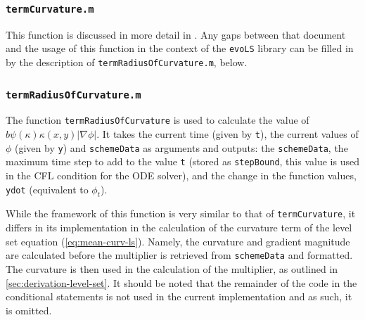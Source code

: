 \documentclass{article}
\begin{document}
\subsubsection{\texttt{termCurvature.m}}
\label{sec:termCurv}

This function is discussed in more detail in \cite{mitchell}. Any
gaps between that document and the usage of this function in the
context of the \texttt{evoLS} library can be filled in by the
description of \texttt{termRadiusOfCurvature.m}, below.

\subsubsection{\texttt{termRadiusOfCurvature.m}}
\label{sec:termRoC}



The function \texttt{termRadiusOfCurvature} is used to calculate
the value of $b\psi(\kappa)\kappa(x,y)\left|\nabla
  \phi\right|$. It takes the current time (given by \texttt{t}), the current values of
$\phi$ (given by \texttt{y}) and \texttt{schemeData} as arguments and
outputs: the \texttt{schemeData}, the maximum time step to add to
the value \texttt{t} (stored as \texttt{stepBound}, this value is
used in the CFL condition for the ODE solver), and the change in the
function values, \texttt{ydot} (equivalent to $\phi_t$). 


\lstellipsisbelow

While the framework of this function is very similar to that of
\texttt{termCurvature}, it differs in its implementation in the
calculation of the curvature term of the level set equation
(\autoref{eq:mean-curv-ls}). Namely, the curvature and gradient
magnitude are calculated before the multiplier is retrieved from
\texttt{schemeData} and formatted. The curvature is then used in
the calculation of the multiplier, as outlined in
\autoref{sec:derivation-level-set}. It should be noted that the
remainder of the code in the conditional statements is not used in
the current implementation and as such, it is omitted.


\end{document}
